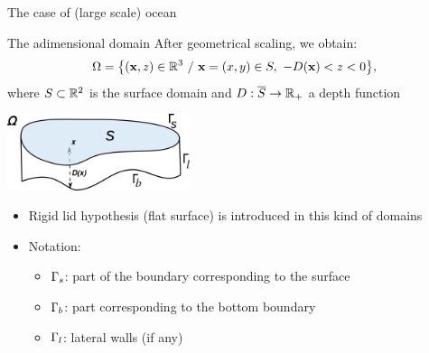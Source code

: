 \begin{frame}{The case of (large scale) ocean}
\end{frame}


\begin{frame}{The adimensional domain}
 After geometrical scaling, we obtain:
   $$
   \Omega = \bigl\{ (\mathbf{x},z)\in {\mathbb R}^{3} \ /\ \mathbf{x}=(x,y)\in S,\
   -D(\mathbf{x})< z < 0 \bigr\},
   $$
   where $S\subset{\mathbb R}^{2}$ is the surface domain and
   $D:\overline{S} \to {\mathbb R}_{+}$ a depth function
   \begin{center}
     \includegraphics[width=0.4\textwidth, height=5\baselineskip]{img/domain}
   \end{center}
   \begin{itemize}
   \item \alert{Rigid lid hypothesis} (flat surface) is introduced in
     this kind of domains
   \item Notation:
     \begin{itemize}
     \item ${\Gamma_{s}}$: part of the boundary corresponding to
       the surface
     \item ${\Gamma_{b}}$: part corresponding to the bottom
       boundary
     \item ${\Gamma_{l}}$: lateral walls (if any)
     \end{itemize}
   \end{itemize}
 \end{frame}


